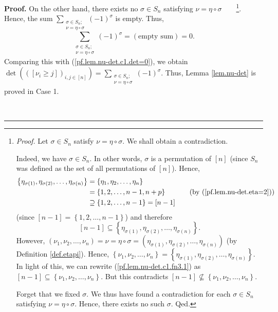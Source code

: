 \documentclass[numbers=enddot,12pt,final,onecolumn,notitlepage,english]{scrartcl}%
\theoremstyle{definition}
\newenvironment{proof}[1][Proof]{\noindent\textbf{#1.} }{\ \rule{0.5em}{0.5em}}
\let\sumnonlimits\sum
\renewcommand{\sum}{\sumnonlimits\limits}
\newenvironment{verlong}{}{}
\begin{document}
\begin{proof}
\begin{verlong}
On the other hand, there exists no $\sigma\in S_{n}$ satisfying $\nu=\eta
\circ\sigma$\ \ \ \ \footnote{\textit{Proof.} Let $\sigma\in S_{n}$ satisfy
$\nu=\eta\circ\sigma$. We shall obtain a contradiction.
\par
Indeed, we have $\sigma\in S_{n}$. In other words, $\sigma$ is a permutation
of $\left[  n\right]  $ (since $S_{n}$ was defined as the set of all
permutations of $\left[  n\right]  $). Hence,
\begin{align*}
\left\{  \eta_{\sigma\left(  1\right)  },\eta_{\sigma\left(  2\right)
},\ldots,\eta_{\sigma\left(  n\right)  }\right\}   &  =\left\{  \eta_{1}%
,\eta_{2},\ldots,\eta_{n}\right\} \\
&  =\left\{  1,2,\ldots,n-1,n+p\right\}  \ \ \ \ \ \ \ \ \ \ \left(  \text{by
(\ref{pf.lem.nu-det.eta=2})}\right) \\
&  \supseteq\left\{  1,2,\ldots,n-1\right\}  =\left[  n-1\right]
\end{align*}
(since $\left[  n-1\right]  =\left\{  1,2,\ldots,n-1\right\}  $) and therefore%
\begin{equation}
\left[  n-1\right]  \subseteq\left\{  \eta_{\sigma\left(  1\right)  }%
,\eta_{\sigma\left(  2\right)  },\ldots,\eta_{\sigma\left(  n\right)
}\right\}  . \label{pf.lem.nu-det.c1.fn3.1}%
\end{equation}
However, $\left(  \nu_{1},\nu_{2},\ldots,\nu_{n}\right)  =\nu=\eta\circ
\sigma=\left(  \eta_{\sigma\left(  1\right)  },\eta_{\sigma\left(  2\right)
},\ldots,\eta_{\sigma\left(  n\right)  }\right)  $ (by Definition
\ref{def.etapi}). Hence, $\left\{  \nu_{1},\nu_{2},\ldots,\nu_{n}\right\}
=\left\{  \eta_{\sigma\left(  1\right)  },\eta_{\sigma\left(  2\right)
},\ldots,\eta_{\sigma\left(  n\right)  }\right\}  $. In light of this, we can
rewrite (\ref{pf.lem.nu-det.c1.fn3.1}) as $\left[  n-1\right]  \subseteq
\left\{  \nu_{1},\nu_{2},\ldots,\nu_{n}\right\}  $. But this contradicts
$\left[  n-1\right]  \not \subseteq \left\{  \nu_{1},\nu_{2},\ldots,\nu
_{n}\right\}  $.
\par
Forget that we fixed $\sigma$. We thus have found a contradiction for each
$\sigma\in S_{n}$ satisfying $\nu=\eta\circ\sigma$. Hence, there exists no
such $\sigma$. Qed.}. Hence, the sum $\sum_{\substack{\sigma\in S_{n}%
;\\\nu=\eta\circ\sigma}}\left(  -1\right)  ^{\sigma}$ is empty. Thus,%
\[
\sum_{\substack{\sigma\in S_{n};\\\nu=\eta\circ\sigma}}\left(  -1\right)
^{\sigma}=\left(  \text{empty sum}\right)  =0.
\]
Comparing this with (\ref{pf.lem.nu-det.c1.det=0}), we obtain $\det\left(
\left(  \left[  \nu_{i}\geq j\right]  \right)  _{i,j\in\left[  n\right]
}\right)  =\sum_{\substack{\sigma\in S_{n};\\\nu=\eta\circ\sigma}}\left(
-1\right)  ^{\sigma}$. Thus, Lemma \ref{lem.nu-det} is proved in Case 1.
\medskip
\end{verlong}


\end{proof}
\end{document}
